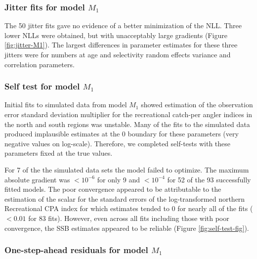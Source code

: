 \documentclass[
]{article}
\begin{document}
\hypertarget{jitter-fits-for-model-m_1}{%
\subsubsection{\texorpdfstring{Jitter fits for model
\(M_1\)}{Jitter fits for model M\_1}}\label{jitter-fits-for-model-m_1}}

The 50 jitter fits gave no evidence of a better minimization of the NLL.
Three lower NLLs were obtained, but with unacceptably large gradients
(Figure \ref{fig:jitter-M1}). The largest differences in parameter
estimates for these three jitters were for numbers at age and
selectivity random effects variance and correlation parameters.

\hypertarget{self-test-for-model-m_1}{%
\subsubsection{\texorpdfstring{Self test for model
\(M_1\)}{Self test for model M\_1}}\label{self-test-for-model-m_1}}

Initial fits to simulated data from model \(M_1\) showed estimation of
the observation error standard deviation multiplier for the recreational
catch-per angler indices in the north and south regions was unstable.
Many of the fits to the simulated data produced implausible estimates at
the 0 boundary for these parameters (very negative values on log-scale).
Therefore, we completed self-tests with these parameters fixed at the
true values.

For 7 of the the simulated data sets the model failed to optimize. The
maximum absolute gradient was \(<10^{-6}\) for only 9 and \(<10^{-4}\)
for 52 of the 93 successfully fitted models. The poor convergence
appeared to be attributable to the estimation of the scalar for the
standard errors of the log-transformed northern Recreational CPA index
for which estimates tended to 0 for nearly all of the fits (\(<0.01\)
for 83 fits). However, even across all fits including those with poor
convergence, the SSB estimates appeared to be reliable (Figure
\ref{fig:self-test-fig}).

\hypertarget{one-step-ahead-residuals-for-model-m_1}{%
\subsubsection{\texorpdfstring{One-step-ahead residuals for model
\(M_1\)}{One-step-ahead residuals for model M\_1}}\label{one-step-ahead-residuals-for-model-m_1}}
\end{document}
